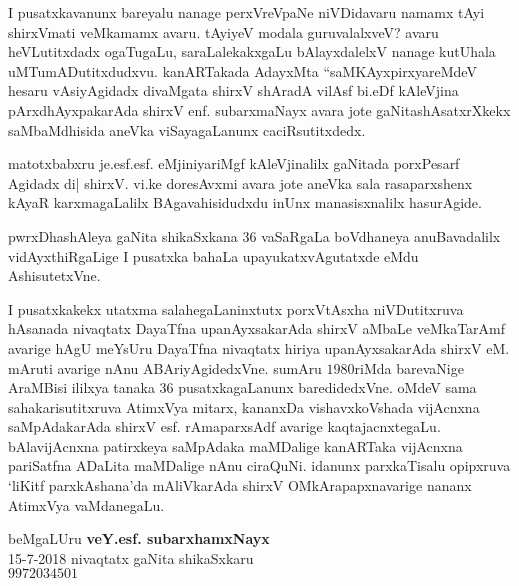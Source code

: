  I pusatxkavanunx bareyalu nanage perxVreVpaNe niVDidavaru namamx tAyi shirxVmati veMkamamx avaru. tAyiyeV modala guruvalalxveV? avaru heVLutitxdadx ogaTugaLu, saraLalekakxgaLu bAlayxdalelxV nanage kutUhala uMTumADutitxdudxvu. kanARTakada AdayxMta ``saMKAyxpirxyareMdeV hesaru vAsiyAgidadx divaMgata shirxV shAradA vilAsf bi.eDf kAleVjina pArxdhAyxpakarAda shirxV enf. subarxmaNayx avara jote gaNitashAsatxrXkekx saMbaMdhisida aneVka viSayagaLanunx caciRsutitxdedx.

 matotxbabxru je.esf.esf. eMjiniyariMgf kAleVjinalilx gaNitada porxPesarf Agidadx di| shirxV. vi.ke doresAvxmi avara jote aneVka sala rasaparxshenx kAyaR karxmagaLalilx BAgavahisidudxdu inUnx manasisxnalilx hasurAgide.

 pwrxDhashAleya gaNita shikaSxkana $36$ vaSaRgaLa boVdhaneya anuBavadalilx vidAyxthiRgaLige I pusatxka bahaLa upayukatxvAgutatxde eMdu AshisutetxVne.

 I pusatxkakekx utatxma salahegaLaninxtutx porxVtAsxha niVDutitxruva hAsanada nivaqtatx DayaTfna upanAyxsakarAda shirxV aMbaLe veMkaTarAmf avarige hAgU meYsUru DayaTfna nivaqtatx hiriya upanAyxsakarAda shirxV eM. mAruti avarige nAnu ABAriyAgidedxVne. sumAru $1980$riMda barevaNige AraMBisi ililxya tanaka $36$ pusatxkagaLanunx baredidedxVne. oMdeV sama sahakarisutitxruva AtimxVya mitarx, kananxDa vishavxkoVshada vijAcnxna saMpAdakarAda shirxV esf. rAmaparxsAdf avarige kaqtajacnxtegaLu. bAlavijAcnxna patirxkeya saMpAdaka maMDalige kanARTaka vijAcnxna pariSatfna ADaLita maMDalige nAnu ciraQuNi. idanunx parxkaTisalu opipxruva `liKitf parxkAshana'da mAliVkarAda shirxV OMkArapapxnavarige nananx AtimxVya vaMdanegaLu.


 \bigskip
 
\begin{flushright}
 beMgaLUru \hfill{\bf veY.esf. subarxhamxNayx}\hfill\\
 {\rm 15-7-2018} \hfill{nivaqtatx gaNita shikaSxkaru}\\
 \hfill$9972034501$  
\end{flushright}
 
